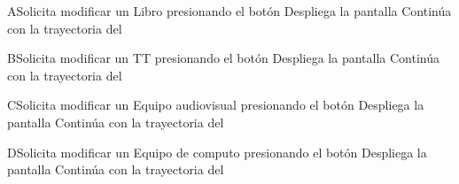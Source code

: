 
\begin{UCtrayectoriaA}{A}{Solicita modificar un Libro presionando el botón }	
		\UCpaso[\UCsist] Despliega la pantalla  
		\UCpaso[\UCsist] Continúa con la trayectoria del 
		\end{UCtrayectoriaA}

\begin{UCtrayectoriaA}{B}{Solicita modificar un TT presionando el botón }	
		\UCpaso[\UCsist] Despliega la pantalla  
		\UCpaso[\UCsist] Continúa con la trayectoria del 
\end{UCtrayectoriaA}


\begin{UCtrayectoriaA}{C}{Solicita modificar un  Equipo audiovisual presionando el botón }	
		\UCpaso[\UCsist] Despliega la pantalla  
		\UCpaso[\UCsist] Continúa con la trayectoria del 
\end{UCtrayectoriaA}


\begin{UCtrayectoriaA}{D}{Solicita modificar un Equipo de computo presionando el botón }	
		\UCpaso[\UCsist] Despliega la pantalla  
		\UCpaso[\UCsist] Continúa con la trayectoria del 
\end{UCtrayectoriaA}

